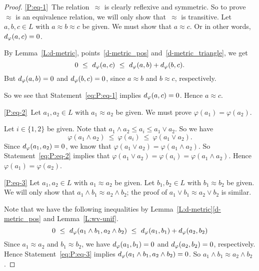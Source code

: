 \documentclass[main.tex]{subfiles}
\begin{document}
\begin{proof}
\ref{P:eq-1}\ 
The relation~$\approx$ is clearly reflexive
and symmetric. So to prove~$\approx$ is an equivalence relation,
we will only show that~$\approx$ is transitive.
Let $a,b,c\in L$ with $a\approx b\approx c$ be given.
We must show that $a\approx c$.
Or in other words, $d_{\smash{\varphi}}(a,c) = 0$.

By Lemma~\ref{L:d-metric}, points~\ref{d-metric_pos}
and~\ref{d-metric_triangle},
we get
\begin{equation}
\label{eq:P:eq-1}
0 \ \leq\ \ld\varphi(a,c) \ \leq\ 
\ld\varphi(a,b) + \ld\varphi(b,c).
\end{equation}
But 
$d_{\smash{\varphi}}(a,b)=0$ and $d_{\smash{\varphi}}(b,c)=0$,
since $a\approx b$ and $b\approx c$, respectively.

So we see that Statement~\eqref{eq:P:eq-1} implies $d_{\smash{\varphi}}(a,c)= 0$.
Hence $a\approx c$.

\vspace{.3em}
\ref{P:eq-2}\ 
Let $a_1,a_2\in L$ with $a_1\approx a_2$ be given.
We must prove $\varphi(a_1) = \varphi(a_2)$.

Let $i\in\{1,2\}$ be given. 
Note that $a_1 \wedge a_2 \leq a_i \leq a_1 \vee a_2$.
So we have 
\begin{equation}
\label{eq:P:eq-2}
\varphi(a_1 \wedge a_2) \ \leq\ \varphi(a_i) \ \leq\  \varphi(a_1 \vee a_2).
\end{equation}
Since $d_{\smash{\varphi}}(a_1,a_2)=0$,
we know that $\varphi(a_1 \vee a_2) = \varphi(a_1 \wedge a_2)$.
So Statement~\eqref{eq:P:eq-2}
implies that
$\varphi(a_1 \vee a_2) = \varphi(a_i) = \varphi(a_1 \wedge a_2)$.
Hence $\varphi(a_1) = \varphi(a_2)$.

\vspace{.3em}
\ref{P:eq-3}
Let $a_1,a_2 \in L$ with $a_1 \approx a_2$ be given.
Let $b_1,b_2 \in L$ with $b_1 \approx b_2$ be given.
We will only show that $a_1 \wedge b_1 \approx a_2 \wedge b_2$;
the proof of $a_1 \vee b_1 \approx a_2 \vee b_2$ is similar.

Note that we have the following inequalities by 
Lemma~\ref{L:d-metric}\ref{d-metric_pos}
and Lemma~\ref{L:wv-unif}.
\begin{equation}
\label{eq:P:eq-3}
0\ \leq\ 
\ld\varphi(a_1 \wedge b_1, a_2\wedge b_2)
\ \leq\ 
\ld\varphi(a_1,b_1) + \ld\varphi(a_2,b_2)
\end{equation}
Since $a_1 \approx a_2$ and $b_1 \approx b_2$,
we have $d_{\smash{\varphi}}(a_1,b_1)=0$
and $d_{\smash{\varphi}}(a_2,b_2)=0$,
respectively.
Hence Statement~\eqref{eq:P:eq-3} implies 
$d_{\smash{\varphi}}(a_1\wedge b_1, a_2 \wedge b_2)=0$.
So $a_1 \wedge b_1 \approx a_2 \wedge b_2$.


\end{proof}
\end{document}
